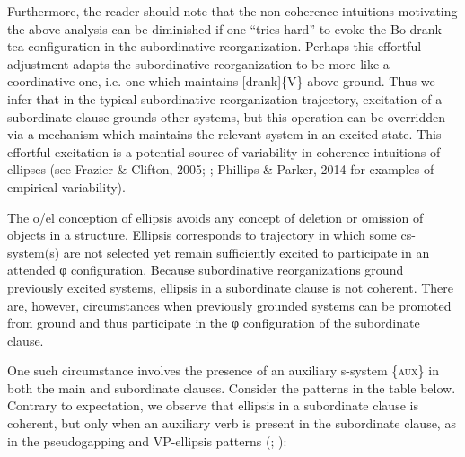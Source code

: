   Furthermore, the reader should note that the non-coherence intuitions motivating the above analysis can be diminished if one “tries hard” to evoke the {\textbar}Bo drank tea{\textbar} configuration in the subordinative reorganization. Perhaps this effortful adjustment adapts the subordinative reorganization to be more like a coordinative one, i.e. one which maintains [drank]\{V\} above ground. Thus we infer that in the typical subordinative reorganization trajectory, excitation of a subordinate clause grounds other systems, but this operation can be overridden via a mechanism which maintains the relevant system in an excited state. This effortful excitation is a potential source of variability in coherence intuitions of ellipses (see Frazier \& Clifton, 2005; \citealt{Phillips2003}; Phillips \& Parker, 2014 for examples of empirical variability). 

  The o/el conception of ellipsis avoids any concept of deletion or omission of objects in a structure. Ellipsis corresponds to trajectory in which some cs-system(s) are not selected yet remain sufficiently excited to participate in an attended φ configuration. Because subordinative reorganizations ground previously excited systems, ellipsis in a subordinate clause is not coherent. There are, however, circumstances when previously grounded systems can be promoted from ground and thus participate in the φ configuration of the subordinate clause. 

  One such circumstance involves the presence of an auxiliary s-system \{\textsc{aux}\} in both the main and subordinate clauses. Consider the patterns in the table below. Contrary to expectation, we observe that ellipsis in a subordinate clause is coherent, but only when an auxiliary verb is present in the subordinate clause, as in the pseudogapping and VP-ellipsis patterns (\citealt{Johnson20012009}; \citealt{Merchant2001}):


